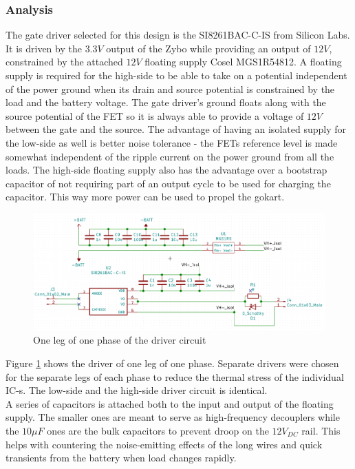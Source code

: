 \subsubsection{Analysis}
The gate driver selected for this design is the SI8261BAC-C-IS from Silicon Labs. It is driven by the $3.3V$ output of the Zybo while providing an output of $12V$, constrained by the attached $12V$ floating supply Cosel MGS1R54812. A floating supply is required for the high-side to be able to take on a potential independent of the power ground when its drain and source potential is constrained by the load and the battery voltage. The gate driver's ground floats along with the source potential of the FET so it is always able to provide a voltage of $12V$ between the gate and the source. The advantage of having an isolated supply for the low-side as well is better noise tolerance - the FETs reference level is made somewhat independent of the ripple current on the power ground from all the loads. The high-side floating supply also has the advantage over a bootstrap capacitor of not requiring  part of an output cycle to be used for charging the capacitor. This way more power can be used to propel the gokart.

\begin{figure}[H]
	\centering
	\includegraphics[width=0.6\linewidth]{pictures/hardware/Driver_Board/driver_circuit.png}
	\caption{One leg of one phase of the driver circuit}
	\label{fig:driver_circuit}
\end{figure}

 Figure \ref{fig:driver_circuit} shows the driver of one leg of one phase. Separate drivers were chosen for the separate legs of each phase to reduce the thermal stress of the individual IC-s. The low-side and the high-side driver circuit is identical. \\

A series of capacitors is attached both to the input and output of the floating supply. The smaller ones are meant to serve as high-frequency decouplers while the $10$$\mu$$F$  ones are the bulk capacitors to prevent droop on the $12V_{DC}$ rail. This helps with countering the noise-emitting effects of the long wires and quick transients from the battery when load changes rapidly. \\

